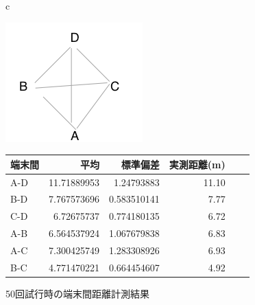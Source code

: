 \documentclass[11pt]{jarticle}
\begin{document}
\begin{figure}[htbp]
  \begin{center}
    \begin{tabular}{c}
      \begin{minipage}{0.4\hsize}
        \begin{center}
          \hspace{-2mm}\includegraphics[clip,width=0.7\hsize]{img/PC_haichi.png}
          \caption{PC配置}
          \label{fig:relpos}
        \end{center}
      \end{minipage}
      \begin{minipage}{0.58\hsize}
        \begin{center}
          \begin{tabular}{l|rrrrr}
            \hline
            {\footnotesize  端末間}&{\footnotesize 平均}&{\footnotesize 標準偏差}&{\footnotesize 実測距離(m) }\\
            \hline
            {\footnotesize A-D }&{\footnotesize 11.71889953}&{\footnotesize 1.24793883}&{\footnotesize 11.10 }\\
            {\footnotesize B-D }&{\footnotesize 7.767573696}&{\footnotesize 0.583510141}&{\footnotesize 7.77 }\\
            {\footnotesize C-D }&{\footnotesize 6.72675737}&{\footnotesize 0.774180135}&{\footnotesize 6.72 }\\
            {\footnotesize A-B }&{\footnotesize 6.564537924}&{\footnotesize 1.067679838}&{\footnotesize 6.83 }\\
            {\footnotesize A-C }&{\footnotesize 7.300425749}&{\footnotesize 1.283308926}&{\footnotesize 6.93 }\\
            {\footnotesize B-C }&{\footnotesize 4.771470221}&{\footnotesize 0.664454607}&{\footnotesize 4.92 }\\
            \hline
          \end{tabular}
          \caption{50回試行時の端末間距離計測結果}
          \label{tab:estdistance}
        \end{center}
      \end{minipage}
    \end{tabular}
  \end{center}
\end{figure}
\end{document}
